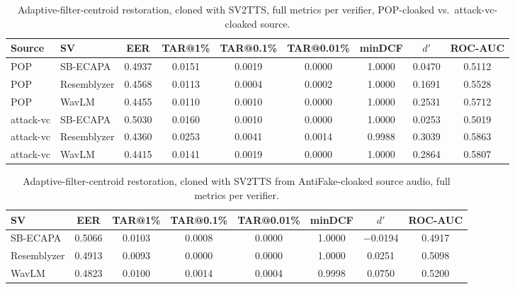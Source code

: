 \documentclass[11pt]{article}
\begin{document}
\begin{table}[H]
\centering
\caption{Adaptive-filter-centroid restoration, cloned with SV2TTS,
full metrics per verifier, POP-cloaked vs.\ attack-vc-cloaked source.}
\label{tab:restoration-adaptive-results}
\begin{tabular}{llccccccc}
\toprule
Source & SV & EER & TAR@1\% & TAR@0.1\% & TAR@0.01\% & minDCF & $d'$ & ROC-AUC \\
\midrule
POP        & SB-ECAPA    & 0.4937 & 0.0151 & 0.0019 & 0.0000 & 1.0000 & 0.0470 & 0.5112 \\
POP        & Resemblyzer & 0.4568 & 0.0113 & 0.0004 & 0.0002 & 1.0000 & 0.1691 & 0.5528 \\
POP        & WavLM       & 0.4455 & 0.0110 & 0.0010 & 0.0000 & 1.0000 & 0.2531 & 0.5712 \\
\addlinespace
attack-vc  & SB-ECAPA    & 0.5030 & 0.0160 & 0.0010 & 0.0000 & 1.0000 & 0.0253 & 0.5019 \\
attack-vc  & Resemblyzer & 0.4360 & 0.0253 & 0.0041 & 0.0014 & 0.9988 & 0.3039 & 0.5863 \\
attack-vc  & WavLM       & 0.4415 & 0.0141 & 0.0019 & 0.0000 & 1.0000 & 0.2864 & 0.5807 \\
\bottomrule
\end{tabular}
\end{table}

\begin{table}[H]
\centering
\caption{Adaptive-filter-centroid restoration, cloned with SV2TTS from
AntiFake-cloaked source audio, full metrics per verifier.}
\label{tab:restoration-adaptive-antifake-results}
\begin{tabular}{lccccccc}
\toprule
SV & EER & TAR@1\% & TAR@0.1\% & TAR@0.01\% & minDCF & $d'$ & ROC-AUC \\
\midrule
SB-ECAPA    & 0.5066 & 0.0103 & 0.0008 & 0.0000 & 1.0000 & $-$0.0194 & 0.4917 \\
Resemblyzer & 0.4913 & 0.0093 & 0.0000 & 0.0000 & 1.0000 & 0.0251 & 0.5098 \\
WavLM       & 0.4823 & 0.0100 & 0.0014 & 0.0004 & 0.9998 & 0.0750 & 0.5200 \\
\bottomrule
\end{tabular}
\end{table}
\end{document}
